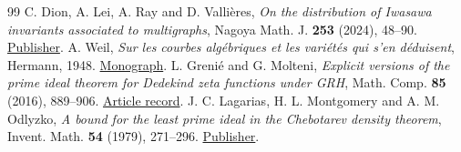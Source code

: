 \begin{thebibliography}{99}
 C. Dion, A. Lei, A. Ray and D. Valli\`eres, \emph{On the distribution of Iwasawa invariants associated to multigraphs}, Nagoya Math. J. \textbf{253} (2024), 48--90. \href{https://doi.org/10.1017/nmj.2023.18}{Publisher}.
 A. Weil, \emph{Sur les courbes alg\'ebriques et les vari\'et\'es qui s'en d\'eduisent}, Hermann, 1948. \href{https://denisevellachemla.eu/Weil-courbes-varietes.pdf}{Monograph}.
 L. Greni\'e and G. Molteni, \emph{Explicit versions of the prime ideal theorem for Dedekind zeta functions under GRH}, Math. Comp. \textbf{85} (2016), 889--906. \href{https://air.unimi.it/handle/2434/448115}{Article record}.
 J. C. Lagarias, H. L. Montgomery and A. M. Odlyzko, \emph{A bound for the least prime ideal in the Chebotarev density theorem}, Invent. Math. \textbf{54} (1979), 271--296. \href{https://doi.org/10.1007/BF01390234}{Publisher}.
\end{thebibliography}
